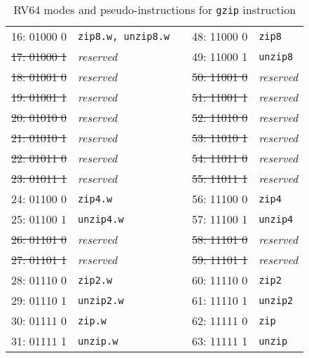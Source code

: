\begin{table}[h]
\begin{small}
\begin{center}
\begin{tabular}{c l p{1in} c l}
\cline{1-2}
\cline{4-5}

      16: 01000 0  & {\tt zip8.w, unzip8.w}   &   &         48: 11000 0  & {\tt zip8}              \\
\sout{17: 01000 1} & {\it reserved}           &   &         49: 11000 1  & {\tt unzip8}            \\
\sout{18: 01001 0} & {\it reserved}           &   &   \sout{50: 11001 0} & {\it reserved}          \\
\sout{19: 01001 1} & {\it reserved}           &   &   \sout{51: 11001 1} & {\it reserved}          \\
\sout{20: 01010 0} & {\it reserved}           &   &   \sout{52: 11010 0} & {\it reserved}          \\
\sout{21: 01010 1} & {\it reserved}           &   &   \sout{53: 11010 1} & {\it reserved}          \\
\sout{22: 01011 0} & {\it reserved}           &   &   \sout{54: 11011 0} & {\it reserved}          \\
\sout{23: 01011 1} & {\it reserved}           &   &   \sout{55: 11011 1} & {\it reserved}          \\

\cline{1-2}
\cline{4-5}

      24: 01100 0  & {\tt zip4.w}             &   &         56: 11100 0  & {\tt zip4}              \\
      25: 01100 1  & {\tt unzip4.w}           &   &         57: 11100 1  & {\tt unzip4}            \\
\sout{26: 01101 0} & {\it reserved}           &   &   \sout{58: 11101 0} & {\it reserved}          \\
\sout{27: 01101 1} & {\it reserved}           &   &   \sout{59: 11101 1} & {\it reserved}          \\
      28: 01110 0  & {\tt zip2.w}             &   &         60: 11110 0  & {\tt zip2}              \\
      29: 01110 1  & {\tt unzip2.w}           &   &         61: 11110 1  & {\tt unzip2}            \\
      30: 01111 0  & {\tt zip.w}              &   &         62: 11111 0  & {\tt zip}               \\
      31: 01111 1  & {\tt unzip.w}            &   &         63: 11111 1  & {\tt unzip}             \\
\end{tabular}
\end{center}
\end{small}
\caption{RV64 modes and pseudo-instructions for {\tt gzip} instruction}
\label{gzip64-modes}
\end{table}

